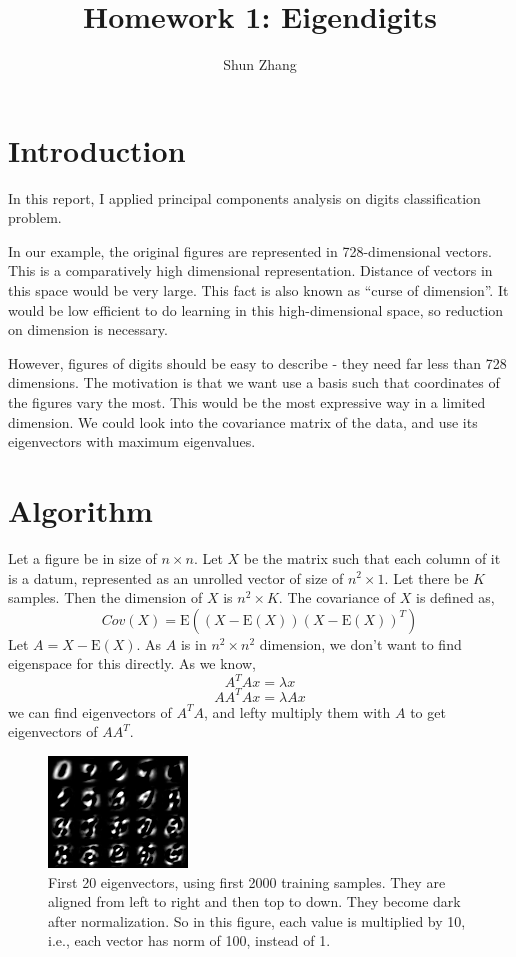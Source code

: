 \documentclass[10pt]{article}
\title{Homework 1: Eigendigits}
\author{Shun Zhang}
\date{}
\begin{document}
\maketitle

\section{Introduction}

In this report, I applied principal components analysis on digits
classification problem.

In our example, the original figures are represented in
728-dimensional vectors. This is a comparatively high dimensional
representation. Distance of vectors in this space would be very large.
This fact is also known as ``curse of dimension''. It would be low
efficient to do learning in this high-dimensional space, so reduction
on dimension is necessary.

However, figures of digits should be easy to describe - they need far
less than 728 dimensions. The motivation is that we want use a basis
such that coordinates of the figures vary the most. This would be the
most expressive way in a limited dimension. We could look into the
covariance matrix of the data, and use its eigenvectors with maximum
eigenvalues.

\section{Algorithm}

Let a figure be in size of $n \times n$. Let $X$ be the matrix such
that each column of it is a datum, represented as an unrolled vector
of size of $n^2 \times 1$. Let there be $K$ samples. Then the
dimension of $X$ is $n^2 \times K$. The covariance of $X$ is defined
as,
$$Cov(X) = \mathrm{E}((X - \mathrm{E}(X))(X - \mathrm{E}(X))^T)$$
Let $A = X - \mathrm{E}(X)$. As $A$ is in $n^2 \times n^2$ dimension,
we don't want to find eigenspace for this directly. As we know,
$$A^TAx = \lambda x$$
$$AA^TAx = \lambda Ax$$
we can find eigenvectors of $A^TA$, and lefty multiply them with $A$
to get eigenvectors of $AA^T$.

\begin{figure}
\centering
\includegraphics[]{eigen.png}
\caption{First 20 eigenvectors, using first 2000 training samples.
They are aligned from left to right and then top to down. They become dark
after normalization. So in this figure, each value is multiplied by
10, i.e., each vector has norm of 100, instead of 1. }
\label{fig:eigen}
\end{figure}
\end{document}
